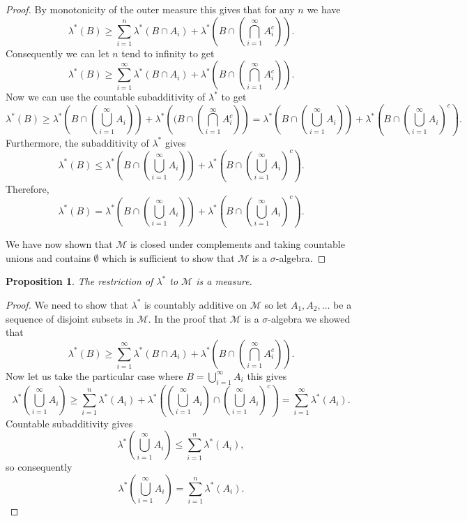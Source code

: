 \documentclass[11pt]{article}
\newtheorem{prp}[thm]{Proposition}
\theoremstyle{definition}
\theoremstyle{remark}
\begin{document}
\begin{proof}
By monotonicity of the outer measure this gives that for any $n$ we have
\[ \lambda^*(B) \geq \sum_{i=1}^n \lambda^*(B \cap A_i) + \lambda^* \left(B \cap \left( \bigcap_{i=1}^\infty A_i^c \right) \right). \] Consequently we can let $n$ tend to infinity to get
\[ \lambda^*(B) \geq \sum_{i=1}^\infty \lambda^*(B \cap A_i) +\lambda^* \left(B \cap \left( \bigcap_{i=1}^\infty A_i^c \right) \right). \] Now we can use the countable subadditivity of $\lambda^*$ to get
\[ \lambda^*(B) \geq \lambda^*\left( B \cap \left( \bigcup_{i=1}^\infty A_i \right)\right) + \lambda^*\left((B \cap \left( \bigcap_{i=1}^\infty A_i^c \right) \right) = \lambda^* \left( B \cap \left( \bigcup_{i=1}^\infty A_i \right) \right) + \lambda^* \left( B \cap \left( \bigcup_{i=1}^\infty A_i \right)^c \right).\] Furthermore, the subadditivity of $\lambda^*$ gives
\[ \lambda^*(B) \leq  \lambda^* \left( B \cap \left( \bigcup_{i=1}^\infty A_i \right) \right) + \lambda^* \left( B \cap \left( \bigcup_{i=1}^\infty A_i \right)^c \right). \] Therefore, 
\[ \lambda^*(B) =  \lambda^* \left( B \cap \left( \bigcup_{i=1}^\infty A_i \right) \right) + \lambda^* \left( B \cap \left( \bigcup_{i=1}^\infty A_i \right)^c \right). \]

We have now shown that $\mathscr{M}$ is closed under complements and taking countable unions and contains $\emptyset$ which is sufficient to show that $\mathscr{M}$ is a $\sigma$-algebra.
\end{proof}

\begin{prp}
The restriction of $\lambda^*$ to $\mathscr{M}$ is a measure. 
\end{prp}
\begin{proof}
We need to show that $\lambda^*$ is countably additive on $\mathscr{M}$ so let $A_1, A_2, \dots$ be a sequence of disjoint subsets in $\mathscr{M}$. In the proof that $\mathscr{M}$ is a $\sigma$-algebra we showed that 
\[ \lambda^*(B) \geq \sum_{i=1}^\infty \lambda^*(B \cap A_i) + \lambda^* \left( B \cap \left( \bigcap_{i=1}^\infty A_i^c \right) \right).  \] Now let us take the particular case where $B = \bigcup_{i=1}^\infty A_i$ this gives
\[ \lambda^* \left( \bigcup_{i=1}^\infty A_i \right) \geq \sum_{i=1}^n \lambda^*(A_i) + \lambda^* \left(\left( \bigcup_{i=1}^\infty A_i \right) \cap \left( \bigcup_{i=1}^\infty A_i \right)^c \right) = \sum_{i=1}^\infty \lambda^* (A_i). \] Countable subadditivity gives
\[ \lambda^* \left( \bigcup_{i=1}^\infty A_i \right) \leq \sum_{i=1}^n \lambda^*(A_i),  \] so consequently
\[ \lambda^* \left( \bigcup_{i=1}^\infty A_i \right) = \sum_{i=1}^n \lambda^*(A_i).  \]
\end{proof}
\end{document}
